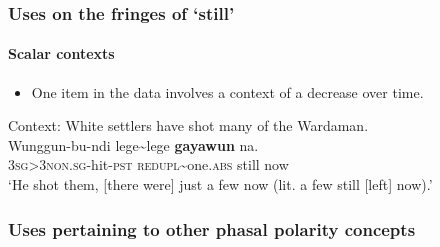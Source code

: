 \subsubsection{Uses on the fringes of \lq{}still\rq{}}
\paragraph{Scalar contexts}\label{appendixWardamanScalar}
\begin{itemize}
	\item One item in the data involves a context of a decrease over time.
\end{itemize}
\begin{exe}
	\ex Context: White settlers have shot many of the Wardaman.\label{exAppendixWardamanDecrement}\\
	\gll Wunggun-bu-ndi lege\sim lege \textbf{gayawun} na.\\
	3\textsc{sg}>3\textsc{non}.\textsc{sg}-hit-\textsc{pst} \textsc{redupl}\sim one.\textsc{abs} still now\\
	\glt \lq He shot them, [there were] just a few now (lit. a few still [left] now).\rq{ }\parencite[398]{Merlan1994}
\end{exe}

\subsubsection{Uses pertaining to other phasal polarity concepts}
